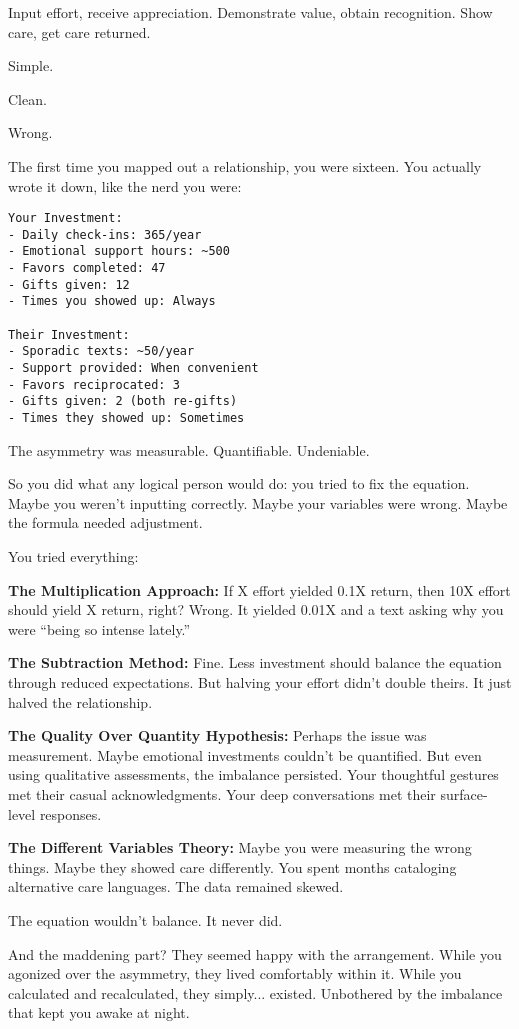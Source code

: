 \documentclass[12pt,letterpaper]{book}
\begin{document}
Input effort, receive appreciation. Demonstrate value, obtain recognition. Show care, get care returned.

Simple.

Clean.

Wrong.

The first time you mapped out a relationship, you were sixteen. You actually wrote it down, like the nerd you were:

\begin{verbatim}
Your Investment: 
- Daily check-ins: 365/year
- Emotional support hours: ~500
- Favors completed: 47
- Gifts given: 12
- Times you showed up: Always

Their Investment:
- Sporadic texts: ~50/year  
- Support provided: When convenient
- Favors reciprocated: 3
- Gifts given: 2 (both re-gifts)
- Times they showed up: Sometimes
\end{verbatim}

The asymmetry was measurable. Quantifiable. Undeniable.

So you did what any logical person would do: you tried to fix the equation. Maybe you weren't inputting correctly. Maybe your variables were wrong. Maybe the formula needed adjustment.

You tried everything:

\textbf{The Multiplication Approach:} If X effort yielded 0.1X return, then 10X effort should yield X return, right? Wrong. It yielded 0.01X and a text asking why you were ``being so intense lately.''

\textbf{The Subtraction Method:} Fine. Less investment should balance the equation through reduced expectations. But halving your effort didn't double theirs. It just halved the relationship.

\textbf{The Quality Over Quantity Hypothesis:} Perhaps the issue was measurement. Maybe emotional investments couldn't be quantified. But even using qualitative assessments, the imbalance persisted. Your thoughtful gestures met their casual acknowledgments. Your deep conversations met their surface-level responses.

\textbf{The Different Variables Theory:} Maybe you were measuring the wrong things. Maybe they showed care differently. You spent months cataloging alternative care languages. The data remained skewed.

The equation wouldn't balance. It never did.

And the maddening part? They seemed happy with the arrangement. While you agonized over the asymmetry, they lived comfortably within it. While you calculated and recalculated, they simply... existed. Unbothered by the imbalance that kept you awake at night.
\end{document}
